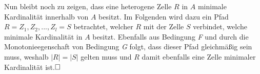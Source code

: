 Nun bleibt noch zu zeigen, dass eine heterogene Zelle $R$ in $A$ minimale Kardinalität innerhalb von $A$ besitzt.
Im Folgenden wird dazu ein Pfad $R=Z_1,Z_2,...,Z_l=S$ betrachtet, welcher $R$ mit der Zelle $S$ verbindet, welche minimale Kardinalität in $A$ besitzt.
Ebenfalls aus Bedingung \emph{F} und durch die Monotonieegenschaft von Bedingung \emph{G} folgt, dass dieser Pfad gleichmäßig sein muss, weshalb $|R|=|S|$ gelten muss und $R$ damit ebenfalls eine Zelle minimaler Kardinalität ist.$\hfill\square$